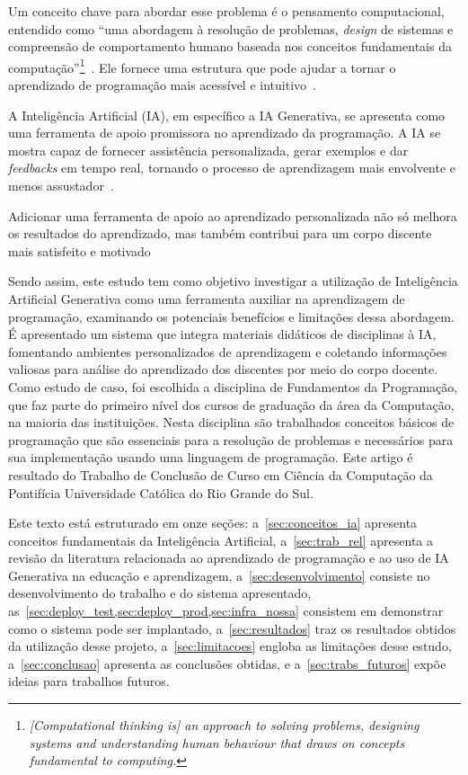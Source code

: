 \documentclass[journal]{IEEEtran}
\begin{document}
Um conceito chave para abordar esse problema é o pensamento computacional,
entendido como ``uma abordagem à resolução de problemas, \textit{design} de sistemas e compreensão de comportamento humano baseada nos conceitos fundamentais da computação''\footnote{%
\textit{[Computational thinking is] an approach to solving problems, designing systems and understanding human behaviour that draws on concepts fundamental to computing.}}~\cite{wing2008computational}.
Ele fornece uma estrutura que pode ajudar a tornar o aprendizado de programação mais acessível e intuitivo~\cite{watson2014failure,wing2008computational,guzdial2015learner,watson2014failure,gomes2017desenvolvendo}.

A Inteligência Artificial (IA), em específico a IA Generativa, se apresenta como uma ferramenta de apoio promissora no aprendizado da programação.
A IA se mostra capaz de fornecer assistência personalizada, gerar exemplos e dar \textit{feedbacks} em tempo real, tornando o processo de aprendizagem mais envolvente e menos assustador~\cite{floridi2020gpt,guzdial2015learner,jeon2023large,celik2022promises,hwang2023chatbotseducation,oliveira_de_souza_2022}.

Adicionar uma ferramenta de apoio ao aprendizado personalizada não só melhora os resultados do aprendizado, mas também contribui para um corpo discente mais satisfeito e motivado~\cite{kinnunen2006students,takacs2022,hong2020introduction}

Sendo assim, este estudo tem como objetivo investigar a utilização de Inteligência Artificial Generativa como uma ferramenta auxiliar na aprendizagem de programação, examinando os potenciais benefícios e limitações dessa abordagem.
É apresentado um sistema que integra materiais didáticos de disciplinas à IA, fomentando ambientes personalizados de aprendizagem e coletando informações valiosas para análise do aprendizado dos discentes por meio do corpo docente.
Como estudo de caso, foi escolhida a disciplina de Fundamentos da Programação, que faz parte do primeiro nível dos cursos de graduação da área da Computação, na maioria das instituições.
Nesta disciplina são trabalhados conceitos básicos de programação que são essenciais para a resolução de problemas e necessários para sua implementação usando uma linguagem de programação.
Este artigo é resultado do Trabalho de Conclusão de Curso em Ciência da Computação da Pontifícia Universidade Católica do Rio Grande do Sul.

Este texto está estruturado em onze seções: a~\cref{sec:conceitos_ia} apresenta conceitos fundamentais da Inteligência Artificial,
a~\cref{sec:trab_rel} apresenta a revisão da literatura relacionada ao aprendizado de programação e ao uso de IA Generativa na educação e aprendizagem,
a~\cref{sec:desenvolvimento} consiste no desenvolvimento do trabalho e do sistema apresentado,
as~\cref{sec:deploy_test,sec:deploy_prod,sec:infra_nossa} consistem em demonstrar como o sistema pode ser implantado,
a~\cref{sec:resultados} traz os resultados obtidos da utilização desse projeto,
a~\cref{sec:limitacoes} engloba as limitações desse estudo,
a~\cref{sec:conclusao} apresenta as conclusões obtidas,
e a~\cref{sec:trabs_futuros} expõe ideias para trabalhos futuros.
\end{document}
